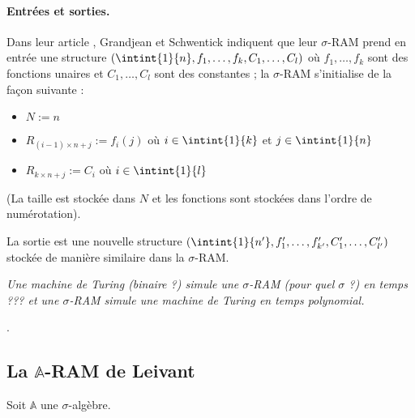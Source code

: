 \documentclass{report}
\newcommand{\bbA}{\mathbb{A}}
\begin{document}
		
			\paragraph{Entrées et sorties.}
			Dans leur article \cite{GrandjeanSchwentick2002}, Grandjean et Schwentick indiquent que leur $\sigma$-RAM prend en entrée une structure $\left( \intint{1}{n},  f_1, \dots, f_k, C_1, \dots, C_l \right)$ où $f_1, \dots, f_k$ sont des fonctions unaires et $C_1, \dots, C_l$ sont des constantes ; la $\sigma$-RAM s'initialise de la façon suivante : 
			
			\begin{itemize}[itemsep=-1mm]
				\item 	$N := n$
				\item 	$R_{(i-1) \times n + j} := f_i(j)$ où $i \in \intint{1}{k}$ et $j \in \intint{1}{n}$
				\item 	$R_{k \times n + j} := C_i$ où $i \in \intint{1}{l}$
			\end{itemize}
			(La taille est stockée dans $N$ et les fonctions sont stockées dans l'ordre de numérotation).
			
			La sortie est une nouvelle structure $\left( \intint{1}{n'}, f'_1, \dots, f'_{k'}, C'_1, \dots, C'_{l'}\right)$ stockée de manière similaire dans la $\sigma$-RAM. 
		
		
		\begin{theorem}
			\label{thm:sRAMs_turing_complete}
			\emph{Une machine de Turing (binaire ?) simule une $\sigma$-RAM (pour quel $\sigma$ ?) en temps ??? et une $\sigma$-RAM simule une machine de Turing en temps polynomial.}
		\end{theorem}
		
		.
		
		
		
		
		\subsection{La $\bbA$-RAM de Leivant}
		\label{subsec:A_RAM_de_Leivant}
		
		Soit $\bbA$ une $\sigma$-algèbre. 
		
\end{document}
